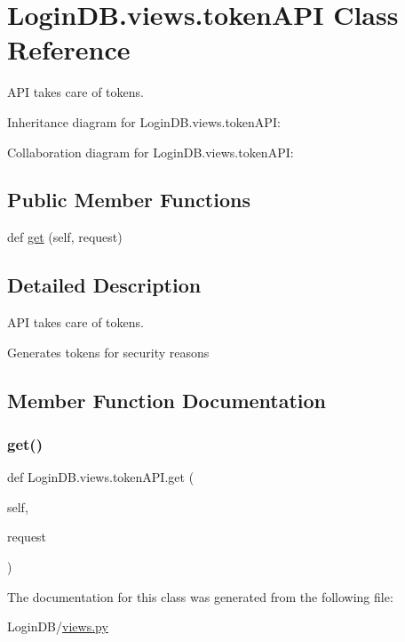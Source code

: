 \hypertarget{class_login_d_b_1_1views_1_1token_a_p_i}{}\section{Login\+D\+B.\+views.\+token\+A\+PI Class Reference}
\label{class_login_d_b_1_1views_1_1token_a_p_i}


A\+PI takes care of tokens.  




Inheritance diagram for Login\+D\+B.\+views.\+token\+A\+PI\+:


Collaboration diagram for Login\+D\+B.\+views.\+token\+A\+PI\+:
\subsection*{Public Member Functions}
\begin{DoxyCompactItemize}
\item 
def \hyperlink{class_login_d_b_1_1views_1_1token_a_p_i_ab689d8027bb5ddb54b3596c9056740fc}{get} (self, request)
\end{DoxyCompactItemize}


\subsection{Detailed Description}
A\+PI takes care of tokens. 

\begin{DoxyVerb}Generates tokens for security reasons
\end{DoxyVerb}
 

\subsection{Member Function Documentation}
\mbox{\label{class_login_d_b_1_1views_1_1token_a_p_i_ab689d8027bb5ddb54b3596c9056740fc}} 
\subsubsection{\texorpdfstring{get()}{get()}}
{\footnotesize\ttfamily def Login\+D\+B.\+views.\+token\+A\+P\+I.\+get (\begin{DoxyParamCaption}\item[{}]{self,  }\item[{}]{request }\end{DoxyParamCaption})}



The documentation for this class was generated from the following file\+:\begin{DoxyCompactItemize}
\item 
Login\+D\+B/\hyperlink{views_8py}{views.\+py}\end{DoxyCompactItemize}
